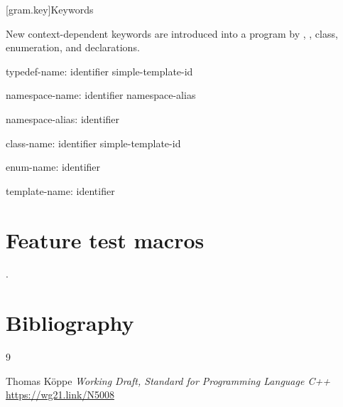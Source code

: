 \documentclass{wg21}
\begin{document}
[gram.key]{Keywords}

\pnum
{}%
New context-dependent keywords are introduced into a program by
,
,
class, enumeration, and
declarations.

\begin{ncbnf}
    typedef-name:\br
    identifier\br
    simple-template-id
\end{ncbnf}

\begin{ncbnf}
    namespace-name:\br
    identifier\br
    namespace-alias
\end{ncbnf}

\begin{ncbnf}
    namespace-alias:\br
    identifier
\end{ncbnf}

\begin{ncbnf}
    class-name:\br
    identifier\br
    simple-template-id
\end{ncbnf}

\begin{ncbnf}
    enum-name:\br
    identifier
\end{ncbnf}

\begin{ncbnf}
    template-name:\br
    identifier \br
\end{ncbnf}


\section{Feature test macros}

.

\section{Bibliography}

\renewcommand{\section}[2]{}%



\begin{thebibliography}{9}

Thomas Köppe
\emph{Working Draft, Standard for Programming Language C++}\newline
\url{https://wg21.link/N5008}


\end{thebibliography}
\end{document}
